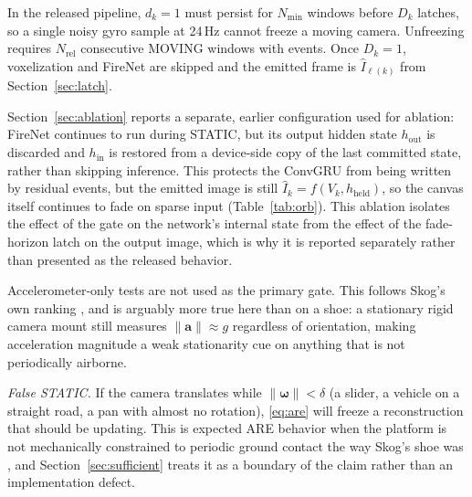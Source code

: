 \documentclass[journal]{IEEEtran}
\DeclareRobustCommand{\norm}[1]{\lVert #1 \rVert}
\begin{document}
In the released pipeline, \(d_k = 1\) must persist for \(N_{\min}\) windows
before \(D_k\) latches, so a single noisy gyro sample at 24\,Hz cannot freeze a
moving camera. Unfreezing requires \(N_{\mathrm{rel}}\) consecutive MOVING
windows with events. Once \(D_k=1\), voxelization and FireNet are skipped and
the emitted frame is \(\hat{I}_{\ell(k)}\) from Section~\ref{sec:latch}.

Section~\ref{sec:ablation} reports a separate, earlier configuration used for
ablation: FireNet continues to run during STATIC, but its output hidden state
\(h_{\mathrm{out}}\) is discarded and \(h_{\mathrm{in}}\) is restored from a
device-side copy of the last committed state, rather than skipping inference.
This protects the ConvGRU from being written by residual events, but the emitted
image is still \(\hat{I}_k = f(V_k, h_{\mathrm{held}})\), so the canvas itself
continues to fade on sparse input (Table~\ref{tab:orb}). This ablation isolates
the effect of the gate on the network's internal state from the effect of the
fade-horizon latch on the output image, which is why it is reported separately
rather than presented as the released behavior.

Accelerometer-only tests are not used as the primary gate. This follows Skog's
own ranking \cite{skog2010tbe,skog2010ipin}, and is arguably more true here than
on a shoe: a stationary rigid camera mount still measures \(\norm{\mathbf{a}}
\approx g\) regardless of orientation, making acceleration magnitude a weak
stationarity cue on anything that is not periodically airborne.

\textit{False STATIC.} If the camera translates while \(\norm{\boldsymbol{\omega}} <
\delta\) (a slider, a vehicle on a straight road, a pan with almost no
rotation), \eqref{eq:are} will freeze a reconstruction that should be updating.
This is expected ARE behavior when the platform is not mechanically constrained
to periodic ground contact the way Skog's shoe was
\cite{skog2010tbe,wahlstrom2021}, and Section~\ref{sec:sufficient} treats it as
a boundary of the claim rather than an implementation defect.
\end{document}
